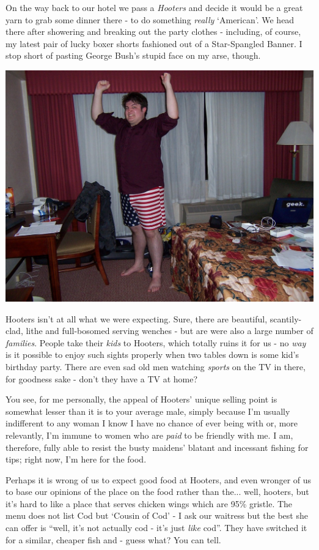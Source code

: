 \documentclass[a5paper,titlepage,11pt]{book}
\begin{document}
On the way back to our hotel we pass a \emph{Hooters} and decide it would be a great yarn to grab some dinner there - to do something \emph{really} `American'.  We head there after showering and breaking out the party clothes - including, of course, my latest pair of lucky boxer shorts fashioned out of a Star-Spangled Banner.  I stop short of pasting George Bush's stupid face on my arse, though.

\begin{center}\includegraphics[width=\textwidth]{gfx/100_1097}\end{center}

Hooters isn't at all what we were expecting.  Sure, there are beautiful, scantily-clad, lithe and full-bosomed serving wenches - but are were also a large number of \emph{families}.  People take their \emph{kids} to Hooters, which totally ruins it for us - no \emph{way} is it possible to enjoy such sights properly when two tables down is some kid's birthday party.  There are even sad old men watching \emph{sports} on the TV in there, for goodness sake - don't they have a TV at home?

You see, for me personally, the appeal of Hooters' unique selling point is somewhat lesser than it is to your average male, simply because I'm usually indifferent to any woman I know I have no chance of ever being with or, more relevantly, I'm immune to women who are \emph{paid} to be friendly with me.  I am, therefore, fully able to resist the busty maidens' blatant and incessant fishing for tips; right now, I'm here for the food.

Perhaps it is wrong of us to expect good food at Hooters, and even wronger of us to base our opinions of the place on the food rather than the... well, hooters, but it's hard to like a place that serves chicken wings which are 95\% gristle.  The menu does not list Cod but `Cousin of Cod' - I ask our waitress but the best she can offer is ``well, it's not actually cod - it's just \emph{like} cod''.  They have switched it for a similar, cheaper fish and - guess what?  You can tell.
\end{document}
